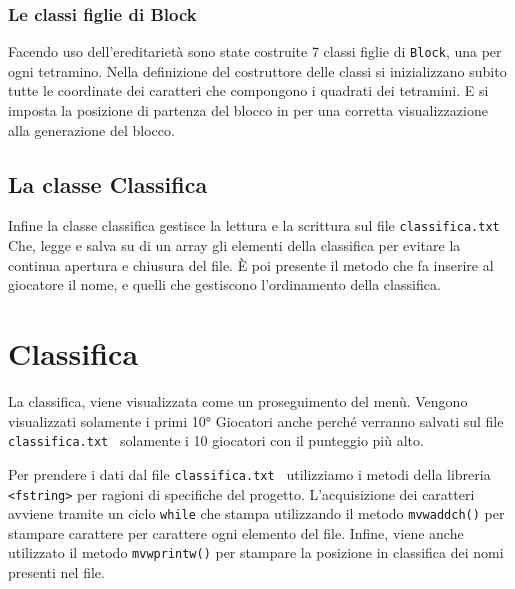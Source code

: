 \documentclass[a4paper]{article}
\begin{document}
\subsubsection{Le classi figlie di Block}
Facendo uso dell'ereditarietà sono state costruite 7 classi figlie di \color{cyan}\verb|Block|\color{black}, una per ogni tetramino. Nella definizione del costruttore delle classi si inizializzano subito tutte le coordinate dei caratteri che compongono i quadrati dei tetramini. E si imposta la posizione di partenza del blocco in per una corretta visualizzazione alla generazione del blocco.

\subsection{La classe Classifica}
Infine la classe classifica gestisce la lettura e la scrittura sul file \color{green}\verb|classifica.txt |\color{black} \\
Che, legge e salva su di un array gli elementi della classifica per evitare la continua apertura e chiusura del file.
È poi presente il metodo che fa inserire al giocatore il nome, e quelli che gestiscono l'ordinamento della classifica.

\color{black}
\section{Classifica}
La classifica, viene visualizzata come un proseguimento del menù.
Vengono visualizzati solamente i primi 10° Giocatori anche perché verranno salvati sul file \color{green}\verb|classifica.txt |\color{black} solamente i 10 giocatori con il punteggio più alto.

Per prendere i dati dal file \color{green}\verb!classifica.txt !\color{black} utilizziamo i metodi della libreria \verb!<fstring>! per ragioni di specifiche del progetto.
L'acquisizione dei caratteri avviene tramite un ciclo \verb!while! che stampa utilizzando il metodo \verb!mvwaddch()! per stampare carattere per carattere ogni elemento del file.
Infine, viene anche utilizzato il metodo \verb!mvwprintw()! per stampare la posizione in classifica dei nomi presenti nel file.
\end{document}
